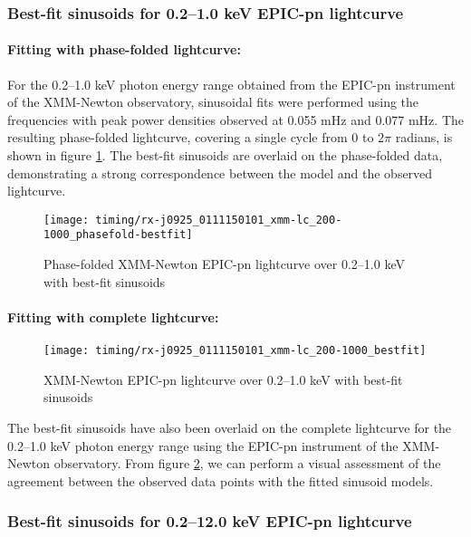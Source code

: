 			\subsubsection{Best-fit sinusoids for 0.2--1.0 keV EPIC-pn lightcurve}
				\paragraph{Fitting with phase-folded lightcurve:}
				For the 0.2--1.0 keV photon energy range obtained from the EPIC-pn instrument of the XMM-Newton observatory, sinusoidal fits were performed using the frequencies with peak power densities observed at 0.055 mHz and 0.077 mHz. The resulting phase-folded lightcurve, covering a single cycle from 0 to $2\pi$ radians, is shown in figure \ref{result:lc-phase-fold-mrvel-xmm:200-1000-bestfit}. The best-fit sinusoids are overlaid on the phase-folded data, demonstrating a strong correspondence between the model and the observed lightcurve.
				\newpage
				\begin{figure}[h!]
					\centering
					\texttt{[image: timing/rx-j0925\_0111150101\_xmm-lc\_200-1000\_phasefold-bestfit]}
					\caption{Phase-folded XMM-Newton EPIC-pn lightcurve over 0.2--1.0 keV with best-fit sinusoids}
					\label{result:lc-phase-fold-mrvel-xmm:200-1000-bestfit}
				\end{figure}
				
				\paragraph{Fitting with complete lightcurve:}
				\begin{figure}[h!]
					\centering
					\texttt{[image: timing/rx-j0925\_0111150101\_xmm-lc\_200-1000\_bestfit]}
					\caption{XMM-Newton EPIC-pn lightcurve over 0.2--1.0 keV with best-fit sinusoids}
					\label{result:lc-mrvel-xmm:200-1000-bestfit}
				\end{figure}
				The best-fit sinusoids have also been overlaid on the complete lightcurve for the 0.2--1.0 keV photon energy range using the EPIC-pn instrument of the XMM-Newton observatory. From figure \ref{result:lc-mrvel-xmm:200-1000-bestfit}, we can perform a visual assessment of the agreement between the observed data points with the fitted sinusoid models.
				
			\subsubsection{Best-fit sinusoids for 0.2--12.0 keV EPIC-pn lightcurve}
